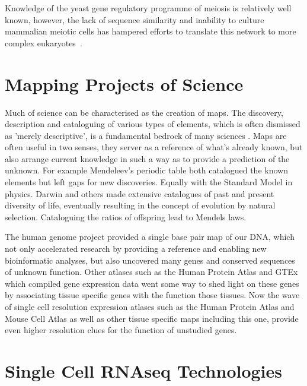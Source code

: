
Knowledge of the yeast gene regulatory programme of meiosis is relatively well known, however, the lack of sequence similarity and inability to culture mammalian meiotic cells has hampered efforts to translate this network to more complex eukaryotes~\cite{Brar2011HighResolution,Mata2002transcriptional,Chu1998Transcriptional,Handel2010Genetics}.

\section{Mapping Projects of Science}

Much of science can be characterised as the creation of maps. The discovery, description and cataloguing of various types of elements, which is often dismissed as 'merely descriptive', is a fundamental bedrock of many sciences \cite{Grimaldi2007Why}. Maps are often useful in two senses, they server as a reference of what's already known, but also arrange current knowledge in such a way as to provide a prediction of the unknown. For example Mendeleev's periodic table both catalogued the known elements but left gaps for new discoveries. Equally with the Standard Model in physics. Darwin and others made extensive catalogues of past and present diversity of life, eventually resulting in the concept of evolution by natural selection. Cataloguing the ratios of offspring lead to Mendels laws.

The human genome project provided a single base pair map of our DNA, which not only accelerated research by providing a reference and enabling new bioinformatic analyses, but also uncovered many genes and conserved sequences of unknown function. Other atlases such as the Human Protein Atlas and GTEx which compiled gene expression data went some way to shed light on these genes by associating tissue specific genes with the function those tissues. Now the wave of single cell resolution expression atlases such as the Human Protein Atlas and Mouse Cell Atlas as well as other tissue specific maps including this one, provide even higher resolution clues for the function of unstudied genes.


\section{Single Cell RNAseq Technologies}

